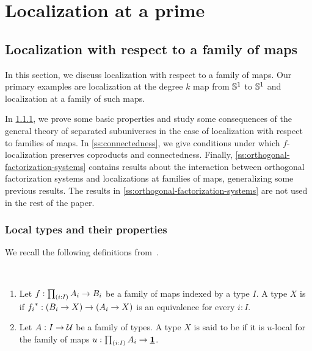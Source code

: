 \chapter{Localization at a prime}

\section{Localization with respect to a family of maps}\label{section:localization}

In this section, we discuss localization with respect to a family of maps.
Our primary examples are localization at the degree $k$ map from $\mathbb{S}^{1}$ to $\mathbb{S}^{1}$
and localization at a family of such maps.

In \cref{ss:basic-properties}, we prove some basic properties and study some consequences
of the general theory of separated subuniverses in the case of localization with respect to families of maps.
In \cref{ss:connectedness}, we give conditions under which
$f$-localization preserves coproducts and connectedness.
Finally, \cref{ss:orthogonal-factorization-systems} contains results about the interaction between
orthogonal factorization systems and localizations at families of maps, generalizing some
previous results. The results in \cref{ss:orthogonal-factorization-systems} are not used in the rest
of the paper.

\subsection{Local types and their properties}\label{ss:basic-properties}

We recall the following definitions from~\cite{RSS}.
\begin{defn}\ 
\begin{enumerate}
\item    Let $f: \prd{i:I} A_i \to B_i$ be a family of maps indexed by a type $I$.
    A type $X$ is \define{$f$-local} if
    ${f_i}^\ast : (B_i \to X) \to (A_i \to X)$ is an equivalence for every $i : I$.
\item Let $A:I\to\mathcal{U}$ be a family of types. A type $X$ is said to be \define{$A$-null} if it is $u$-local for the family of maps $u:\prd{i:I}A_i\to\unit$. 
\end{enumerate}
\end{defn} 

